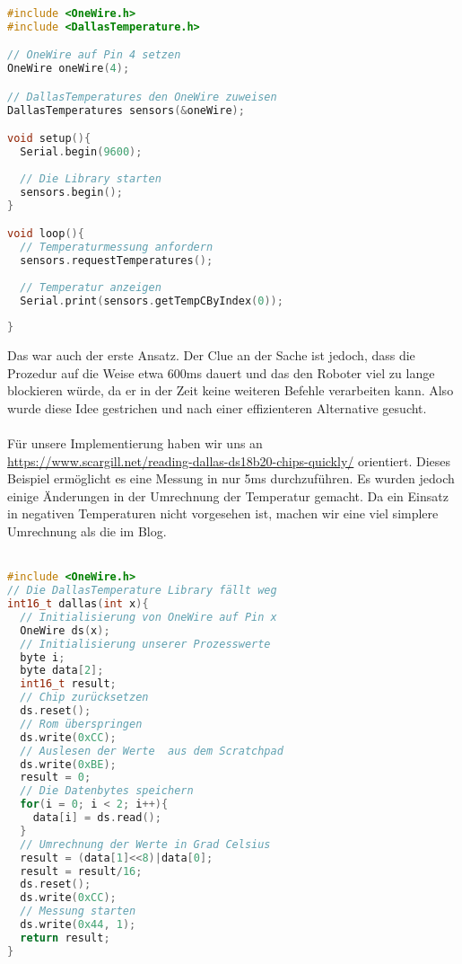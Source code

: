 \documentclass[12pt]{article}
\begin{document}
\begin{file}[DS18B20]
        \begin{lstlisting}[language=C++]
#include <OneWire.h>
#include <DallasTemperature.h>

// OneWire auf Pin 4 setzen			
OneWire oneWire(4);

// DallasTemperatures den OneWire zuweisen
DallasTemperatures sensors(&oneWire);

void setup(){
  Serial.begin(9600);
	
  // Die Library starten
  sensors.begin();
}

void loop(){
  // Temperaturmessung anfordern
  sensors.requestTemperatures();
	
  // Temperatur anzeigen
  Serial.print(sensors.getTempCByIndex(0));
  
}

        \end{lstlisting}
\end{file}
Das war auch der erste Ansatz. Der Clue an der Sache ist jedoch, dass die Prozedur auf die Weise etwa 600ms dauert und das den Roboter viel zu lange blockieren würde, da er in der Zeit keine weiteren Befehle verarbeiten kann. Also wurde diese Idee gestrichen und nach einer effizienteren Alternative gesucht.\\
\\ 
Für unsere Implementierung haben wir uns an\\ \url{https://www.scargill.net/reading-dallas-ds18b20-chips-quickly/} orientiert. Dieses Beispiel ermöglicht es eine Messung in nur 5ms durchzuführen. Es wurden jedoch einige Änderungen in der Umrechnung der Temperatur gemacht. Da ein Einsatz in negativen Temperaturen nicht vorgesehen ist, machen wir eine viel simplere Umrechnung als die im Blog. \\
\\


\begin{file}[DS18B20-1]	
        \begin{lstlisting}[language=C++, inputencoding={utf8}, extendedchars=false]        
#include <OneWire.h>
// Die DallasTemperature Library fällt weg
int16_t dallas(int x){
  // Initialisierung von OneWire auf Pin x  
  OneWire ds(x); 
  // Initialisierung unserer Prozesswerte
  byte i;
  byte data[2];
  int16_t result;
  // Chip zurücksetzen
  ds.reset(); 
  // Rom überspringen
  ds.write(0xCC);
  // Auslesen der Werte  aus dem Scratchpad
  ds.write(0xBE); 
  result = 0;
  // Die Datenbytes speichern
  for(i = 0; i < 2; i++){
    data[i] = ds.read();
  } 
  // Umrechnung der Werte in Grad Celsius
  result = (data[1]<<8)|data[0];
  result = result/16;
  ds.reset();
  ds.write(0xCC);  
  // Messung starten
  ds.write(0x44, 1);
  return result;
}
        \end{lstlisting}
        
\end{file}
\end{document}
